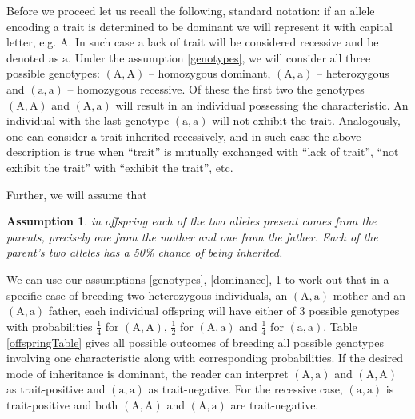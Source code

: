 \documentclass{l4proj}
\newtheorem{assum}{Assumption}
\newcommand{\genotype}[2]{\ensuremath{(\mathrm{#1}, \mathrm{#2})}}
\begin{document}
Before we proceed let us recall the following, standard notation: if an \gls{allele} encoding a trait is determined to be dominant we will represent it with capital letter, e.g. $\mathrm{A}$. In such case a lack of trait will be considered recessive and be denoted as $\mathrm{a}$. Under the assumption \ref{genotypes}, we will consider all three possible genotypes: \genotype{A}{A} -- homozygous dominant, \genotype{A}{a} -- heterozygous and \genotype{a}{a} -- homozygous recessive. Of these the first two the genotypes \genotype{A}{A} and \genotype{A}{a} will result in an individual possessing the characteristic. An individual with the last genotype \genotype{a}{a} will not exhibit the trait. Analogously, one can consider a trait inherited recessively, and in such case the above description is true when ``trait'' is mutually exchanged with ``lack of trait'', ``not exhibit the trait'' with ``exhibit the trait'', etc.

Further, we will assume that
\begin{assum}\label{offspring}
  in offspring each of the two alleles present comes from the parents, precisely one from the mother and one from the father. Each of the parent's two alleles has a 50\% chance of being inherited.
\end{assum}
We can use our assumptions \ref{genotypes}, \ref{dominance}, \ref{offspring} to work out that in a specific case of breeding two heterozygous individuals, an \genotype{A}{a} mother and an \genotype{A}{a} father, each individual offspring will have either of 3 possible genotypes with probabilities $\frac{1}{4}$ for \genotype{A}{A}, $\frac{1}{2}$ for \genotype{A}{a} and $\frac{1}{4}$ for \genotype{a}{a}. Table \ref{offspringTable} gives all possible outcomes of breeding all possible genotypes involving one characteristic along with corresponding probabilities. If the desired mode of inheritance is dominant, the reader can interpret \genotype{A}{a} and \genotype{A}{A} as trait-positive and \genotype{a}{a} as trait-negative. For the recessive case, \genotype{a}{a} is trait-positive and both \genotype{A}{A} and \genotype{A}{a} are trait-negative.
\end{document}
